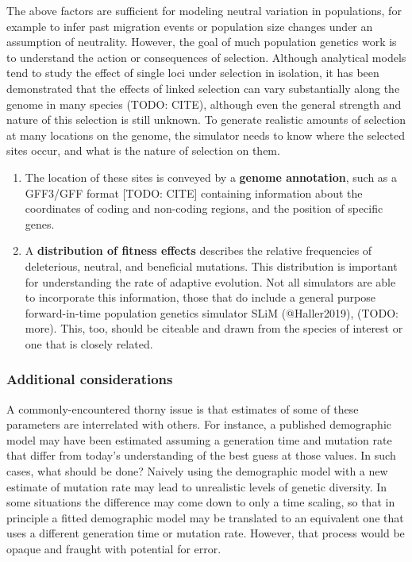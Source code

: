 \documentclass[hidelinks]{article}
\begin{document}
The above factors are sufficient for modeling neutral variation in
populations, for example to infer past migration events or population
size changes under an assumption of neutrality. However, the goal of
much population genetics work is to understand the action or
consequences of selection. Although analytical models tend to study the
effect of single loci under selection in isolation, it has been
demonstrated that the effects of linked selection can vary substantially
along the genome in many species (TODO: CITE), although even the general
strength and nature of this selection is still unknown. To generate
realistic amounts of selection at many locations on the genome, the
simulator needs to know where the selected sites occur, and what is the
nature of selection on them.

\begin{enumerate}
\def\labelenumi{\arabic{enumi}.}
\setcounter{enumi}{5}
\item
  The location of these sites is conveyed by a \textbf{genome
  annotation}, such as a GFF3/GFF format {[}TODO: CITE{]} containing
  information about the coordinates of coding and non-coding regions,
  and the position of specific genes.
\item
  A \textbf{distribution of fitness effects} describes the relative
  frequencies of deleterious, neutral, and beneficial mutations. This
  distribution is important for understanding the rate of adaptive
  evolution. Not all simulators are able to incorporate this
  information, those that do include a general purpose forward-in-time
  population genetics simulator SLiM (@Haller2019), (TODO: more). This,
  too, should be citeable and drawn from the species of interest or one
  that is closely related.
\end{enumerate}

\hypertarget{additional-considerations}{%
\subsubsection{Additional
considerations}\label{additional-considerations}}

A commonly-encountered thorny issue is that estimates of some of these
parameters are interrelated with others. For instance, a published
demographic model may have been estimated assuming a generation time and
mutation rate that differ from today's understanding of the best guess
at those values. In such cases, what should be done? Naively using the
demographic model with a new estimate of mutation rate may lead to
unrealistic levels of genetic diversity. In some situations the
difference may come down to only a time scaling, so that in principle a
fitted demographic model may be translated to an equivalent one that
uses a different generation time or mutation rate. However, that process
would be opaque and fraught with potential for error.
\end{document}
